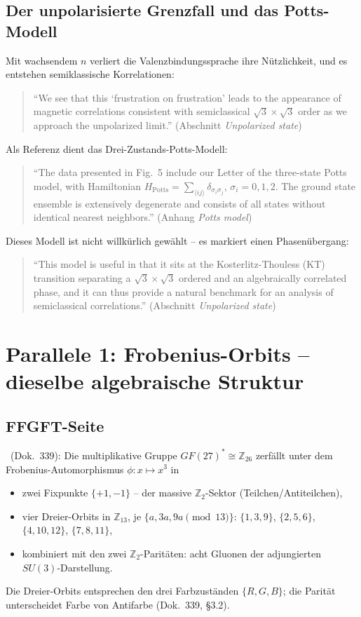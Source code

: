 \subsection{Der unpolarisierte Grenzfall und das Potts-Modell}

Mit wachsendem $n$ verliert die Valenzbindungssprache ihre Nützlichkeit, und
es entstehen semiklassische Korrelationen:
\begin{quote}\QM
\enquote{We see that this \enquote{frustration on frustration} leads to the
appearance of magnetic correlations consistent with semiclassical
$\sqrt{3}\times\sqrt{3}$ order as we approach the unpolarized limit.}
(Abschnitt \emph{Unpolarized state})
\end{quote}
Als Referenz dient das Drei-Zustands-Potts-Modell:
\begin{quote}\QM
\enquote{The data presented in Fig.~5 include our Letter of the three-state
Potts model, with Hamiltonian $H_\text{Potts}=\sum_{\langle ij\rangle}
\delta_{\sigma_i\sigma_j}$, $\sigma_i=0,1,2$. The ground state ensemble is
extensively degenerate and consists of all states without identical nearest
neighbors.} (Anhang \emph{Potts model})
\end{quote}
Dieses Modell ist nicht willkürlich gewählt -- es markiert einen Phasenübergang:
\begin{quote}\QM
\enquote{This model is useful in that it sits at the Kosterlitz-Thouless (KT)
transition separating a $\sqrt{3}\times\sqrt{3}$ ordered and an algebraically
correlated phase, and it can thus provide a natural benchmark for an analysis
of semiclassical correlations.} (Abschnitt \emph{Unpolarized state})
\end{quote}

\section{Parallele 1: Frobenius-Orbits -- dieselbe algebraische Struktur}

\subsection{FFGFT-Seite}

\BM\ (Dok.~339): Die multiplikative Gruppe $GF(27)^*\cong\mathbb{Z}_{26}$
zerfällt unter dem Frobenius-Automorphismus $\phi: x\mapsto x^3$ in
\begin{itemize}
  \item zwei Fixpunkte $\{+1,-1\}$ -- der massive $\mathbb{Z}_2$-Sektor
        (Teilchen/Antiteilchen),
  \item vier Dreier-Orbits in $\mathbb{Z}_{13}$, je $\{a,3a,9a\pmod{13}\}$:
        $\{1,3,9\}$, $\{2,5,6\}$, $\{4,10,12\}$, $\{7,8,11\}$,
  \item kombiniert mit den zwei $\mathbb{Z}_2$-Paritäten: acht Gluonen der
        adjungierten $SU(3)$-Darstellung.
\end{itemize}
Die Dreier-Orbits entsprechen den drei Farbzuständen $\{R,G,B\}$; die
Parität unterscheidet Farbe von Antifarbe (Dok.~339, §3.2).

